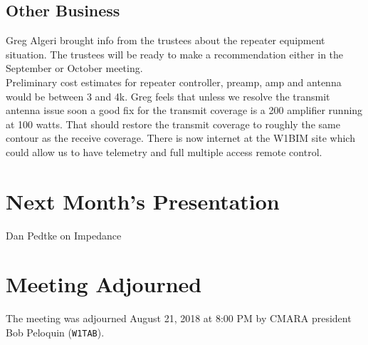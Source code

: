 \documentclass[10pt,letterpaper]{article}
\begin{document}
\subsection{Other Business}
Greg Algeri brought info from the trustees about the repeater equipment situation. The trustees will be ready to make a recommendation either in the September or October meeting.\\

\noindent
Preliminary cost estimates for repeater controller, preamp, amp and antenna would be between 3 and 4k. Greg feels that unless we resolve the transmit antenna issue soon a good fix for the transmit coverage is a 200 amplifier running at 100 watts. That should restore the transmit coverage to roughly the same contour as the receive coverage. There is now internet at the W1BIM site which could allow us to have telemetry and full multiple access remote control.

\section{Next Month's Presentation}
Dan Pedtke on Impedance

\section{Meeting Adjourned}
The meeting was adjourned August 21, 2018 at 8:00 PM by CMARA president Bob Peloquin (\texttt{W1TAB}).
\end{document}

